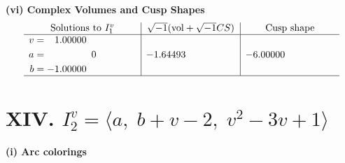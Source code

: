 \documentclass[1p]{elsarticle_modified}
\theoremstyle{definition}
\newcommand{\I}{\sqrt{-1}}
\begin{document}
\newpage\flushleft \textbf{(vi) Complex Volumes and Cusp Shapes}
$$\begin{array}{c|c|c}  
\text{Solutions to }I^v_{1}& \I (\text{vol} + \sqrt{-1}CS) & \text{Cusp shape}\\
 \hline 
\begin{aligned}
v &= \phantom{-}1.00000\phantom{ +0.000000I} \\
a &= \phantom{-0.000000 } 0 \\
b &= -1.00000\phantom{ +0.000000I}\end{aligned}
 & -1.64493\phantom{ +0.000000I} & -6.00000\phantom{ +0.000000I}\\
 \hline 
 \end{array}$$\newpage\newpage\renewcommand{\arraystretch}{1}
\centering \section*{XIV. $I^v_{2}= \langle a,\;b+v-2,\;v^2-3 v+1 \rangle$}
\flushleft \textbf{(i) Arc colorings}\\
\end{document}
